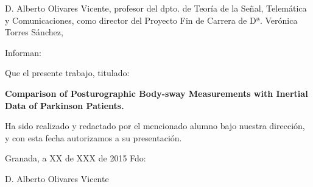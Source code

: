 
\begin{titlepage}
\label{ch:Statement}
\vspace{2cm}

\noindent  D. Alberto Olivares Vicente, profesor  del dpto. de Teoría de la Señal, Telemática y Comunicaciones, como director del Proyecto Fin de Carrera de Dª. Verónica Torres Sánchez,

\vspace{2cm}
\noindent Informan:

\vspace{1.5cm}
\noindent Que el presente trabajo, titulado:

\noindent \textbf{Comparison of Posturographic Body-sway Measurements with Inertial Data of Parkinson Patients.}

\noindent Ha sido realizado y redactado por el mencionado alumno bajo nuestra dirección, y con esta fecha autorizamos a su presentación.
\vspace{3.5cm}

\noindent Granada, a XX de XXX de 2015 Fdo:

\vspace{6.5cm}
\noindent D. Alberto Olivares Vicente  

\end{titlepage} 